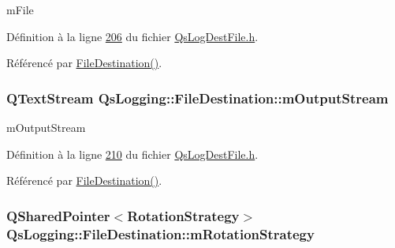 m\-File 



Définition à la ligne \hyperlink{QsLogDestFile_8h_source_l00206}{206} du fichier \hyperlink{QsLogDestFile_8h_source}{Qs\-Log\-Dest\-File.\-h}.



Référencé par \hyperlink{classQsLogging_1_1FileDestination_ad42d6551d58f82eeb61ffc6d7d06d5cd}{File\-Destination()}.

\hypertarget{classQsLogging_1_1FileDestination_a10f0aa5513ec40d3e362179b084a43d6}{
\subsubsection[{m\-Output\-Stream}]{\setlength{\rightskip}{0pt plus 5cm}Q\-Text\-Stream Qs\-Logging\-::\-File\-Destination\-::m\-Output\-Stream\hspace{0.3cm}{\ttfamily [private]}}}\label{classQsLogging_1_1FileDestination_a10f0aa5513ec40d3e362179b084a43d6}


m\-Output\-Stream 



Définition à la ligne \hyperlink{QsLogDestFile_8h_source_l00210}{210} du fichier \hyperlink{QsLogDestFile_8h_source}{Qs\-Log\-Dest\-File.\-h}.



Référencé par \hyperlink{classQsLogging_1_1FileDestination_ad42d6551d58f82eeb61ffc6d7d06d5cd}{File\-Destination()}.

\hypertarget{classQsLogging_1_1FileDestination_ab20945842bd063b5cbe82485168be1f0}{
\subsubsection[{m\-Rotation\-Strategy}]{\setlength{\rightskip}{0pt plus 5cm}Q\-Shared\-Pointer$<${\bf Rotation\-Strategy}$>$ Qs\-Logging\-::\-File\-Destination\-::m\-Rotation\-Strategy\hspace{0.3cm}{\ttfamily [private]}}}\label{classQsLogging_1_1FileDestination_ab20945842bd063b5cbe82485168be1f0}


